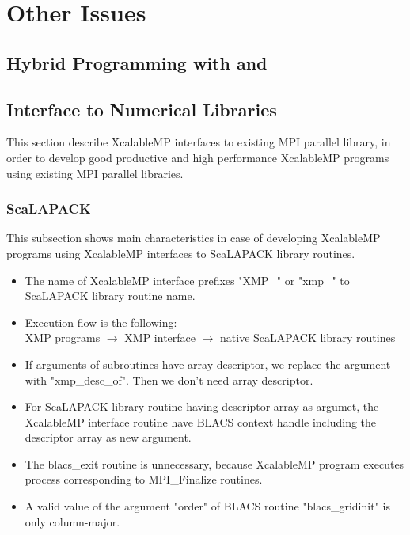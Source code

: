 \chapter{Other Issues}

\section{Hybrid Programming with {\MPI} and {\OMP}}

\subsection{{\MPI}}

\subsection{{\OMP}}

\section{Interface to Numerical Libraries}

   This section describe XcalableMP interfaces to existing MPI parallel library, 
   in order to develop good productive and high performance XcalableMP programs 
   using existing MPI parallel libraries.
   
\subsection{ScaLAPACK}

   This subsection shows main characteristics in case of developing
   XcalableMP programs using XcalableMP interfaces to ScaLAPACK library routines.

\begin{itemize}
\item The name of XcalableMP interface prefixes "XMP\_" or "xmp\_" 
      to ScaLAPACK library routine name.
\item Execution flow is the following:\\
      XMP programs $\to$ XMP interface $\to$ native ScaLAPACK library routines
\item If arguments of subroutines have array descriptor,
      we replace the argument with "xmp\_desc\_of".
      Then we don't need array descriptor. 
\item For ScaLAPACK library routine having descriptor array as argumet,
      the XcalableMP interface routine have BLACS context handle including 
      the descriptor array as new argument.
\item The blacs\_exit routine is unnecessary, because XcalableMP program executes process 
      corresponding to MPI\_Finalize routines.
\item A valid value of the argument "order" of BLACS routine "blacs\_gridinit" is 
      only column-major. 
\end{itemize}

